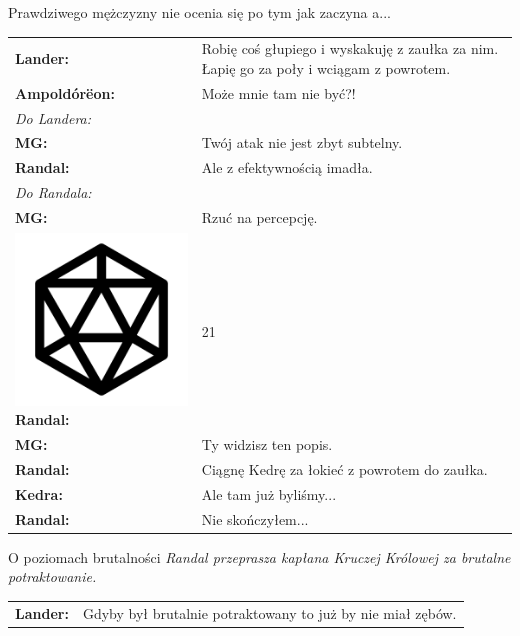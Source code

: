 \documentclass[10pt,twoside,twocolumn]{book}
\begin{document}
\begin{rpg-quotebox}{Prawdziwego mężczyzny nie ocenia się po tym jak zaczyna a...}
   \begin{tabularx}{\columnwidth}{lX}
      \textbf{Lander:} & Robię coś głupiego i wyskakuję z zaułka za nim. Łapię go za poły i wciągam z powrotem.\\
      \textbf{Ampoldórëon:} & Może mnie tam nie być?!\\
      \multicolumn{2}{l}{\textit{Do Landera:}}\\
      \textbf{MG:} & Twój atak nie jest zbyt subtelny.\\
      \textbf{Randal:} & Ale z efektywnością imadła.\\
      \multicolumn{2}{l}{\textit{Do Randala:}}\\
      \textbf{MG:} & Rzuć na percepcję.\\
      \includegraphics[scale=0.06]{img/d20.png}\textbf{Randal:}& 21\\
      \textbf{MG:} & Ty widzisz ten popis.\\
      \textbf{Randal:} & Ciągnę Kedrę za łokieć z powrotem do zaułka.\\
      \textbf{Kedra:} & Ale tam już byliśmy...\\
      \textbf{Randal:} & Nie skończyłem...\\
   \end{tabularx}
\end{rpg-quotebox}


\begin{rpg-quotebox}{O poziomach brutalności}
   \textit{Randal przeprasza kapłana Kruczej Królowej za brutalne potraktowanie.}\\

   \begin{tabularx}{\columnwidth}{lX}
      \textbf{Lander:} & Gdyby był brutalnie potraktowany to już by nie miał zębów.\\
   \end{tabularx}
\end{rpg-quotebox}
\end{document}
